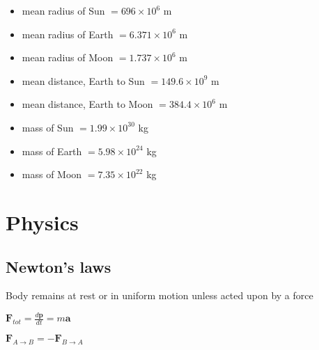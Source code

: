 \documentclass[letterpaper,landscape,10pt]{article}
\newenvironment{mydescription}
{\begin{description}
	\setlength{\itemsep}{0pt}
	\setlength{\parskip}{0pt}
	\setlength{\parsep}{-1pt}}
{\end{description}}
\newenvironment{myitemize}
{\begin{itemize}
	\setlength{\itemsep}{-1pt}
	\setlength{\parskip}{0pt}
	\setlength{\parsep}{0pt}}
{\end{itemize}}
\begin{document}
{\begin{multicols}{3}
\begin{myitemize}
		\item[$R_S = $]
		  mean radius of Sun $ = 696\times10^{6}$ m
		\item[$R_E = $]
		  mean radius of Earth $ = 6.371\times10^{6}$ m
		\item[$R_M = $]
		  mean radius of Moon $ = 1.737\times10^{6}$ m

		\vspace{4pt}

	  	\item[$R_{S_{E}} = $]
		  mean distance, Earth to Sun $ = 149.6\times10^{9}$ m
		\item[$D = $]
		  mean distance, Earth to Moon $ = 384.4\times10^{6}$ m

		\vspace{4pt}

		\item[$M_S = $]
		  mass of Sun $ = 1.99\times10^{30}$ kg
		\item[$M_E = $]
		  mass of Earth $ = 5.98\times10^{24}$ kg
		\item[$M_m = $]
		  mass of Moon $ = 7.35\times10^{22}$ kg



	\end{myitemize}

\section*{Physics}

	\subsection*{Newton's laws}
		\begin{mydescription}
			\item[1\textsuperscript{st}:]
				Body remains at rest or in uniform motion unless acted upon by
				a force  \\
			\item[2\textsuperscript{nd}:]
				$\mathbf{F}_{tot} = \frac{d\mathbf{p}}{dt} = m\mathbf{a}$	\\
			\item[3\textsuperscript{rd}:]
				$\mathbf{F}_{A \rightarrow B} = -\mathbf{F}_{B \rightarrow A}$\\
		\end{mydescription}
	

\end{multicols}}
\end{document}
